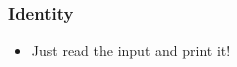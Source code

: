\begin{frame}
	\frametitle{Identity}
    \begin{itemize}
			\item Just read the input and print it!
    \end{itemize}
\end{frame}
